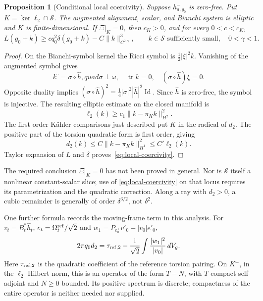 \documentclass[11pt]{article}
\newcommand{\tr}{\operatorname{tr}}
\newcommand{\Id}{\operatorname{Id}}
\newcommand{\dd}{\,dV_g}
\newtheorem{proposition}[theorem]{Proposition}
\theoremstyle{definition}
\theoremstyle{remark}
\begin{document}
\begin{proposition}[Conditional local coercivity]
\label{prop:conditional-local}
Suppose $h_{a,g_0}^-$ is zero-free. Put
$K=\ker\ell_2\cap\mathcal S$. The augmented alignment, scalar, and
Bianchi system is elliptic and $K$ is finite-dimensional. If
$\Xi|_K=0$, then $c_K>0$, and for every $0<c<c_K$,
\begin{equation}
 L(g_0+k)\ge c q_0^2\delta(g_0+k)
                   -C\|k\|_{C^{2,\gamma}}^3,
 \qquad k\in\mathcal S\text{ sufficiently small},\quad0<\gamma<1.
 \label{eq:local-coercivity}
\end{equation}
\end{proposition}
\begin{proof}
On the Bianchi-symbol kernel the Ricci symbol is
$\tfrac12|\xi|^2k$. Vanishing of the augmented symbol gives
\[
 k^\circ=\sigma\circ\widehat h,quad \sigma\perp\omega,\quad
 \tr k=0,\quad (\sigma\circ\widehat h)\xi=0.
\]
Opposite duality implies
$(\sigma\circ\widehat h)^2=\tfrac14|\sigma|^2|\widehat h|^2\Id$.
Since $\widehat h$ is zero-free, the symbol is injective. The resulting
elliptic estimate on the closed manifold is
\[
 \ell_2(k)\ge c_1\|k-\pi_Kk\|_{H^2}^2.
\]
The first-order K\"ahler comparisons just described put $K$ in the
radical of $d_2$. The positive part of the torsion quadratic form is
first order, giving
\[
 d_2(k)\le C\|k-\pi_Kk\|_{H^1}^2\le C'\ell_2(k).
\]
Taylor expansion of $L$ and $\delta$ proves~\eqref{eq:local-coercivity}.
\end{proof}
The required conclusion $\Xi|_K=0$ has not been proved in general.
Nor is $\mathcal S$ itself a nonlinear constant-scalar slice; use of
\eqref{eq:local-coercivity} on that locus requires its parametrization
and the quadratic correction. Along a ray with $d_2>0$, a cubic remainder
is generally of order $\delta^{3/2}$, not $\delta^2$.

One further formula records the moving-frame term in this analysis.
For $v_t=B_t^*\widehat h_t$, $e_t=\Omega_t^{\rm ref}/\sqrt2$ and
$w_1=P_{e_0^\perp}v'_0-|v_0|e'_0$,
\begin{equation}
 2\pi q_0d_2=\tau_{{\rm ref},2}
             -\frac1{\sqrt2}\int\frac{|w_1|^2}{|v_0|}\dd.
 \label{eq:delta-Hessian}
\end{equation}
Here $\tau_{{\rm ref},2}$ is the quadratic coefficient of the reference
torsion pairing. On $K^\perp$, in the $\ell_2$ Hilbert norm, this is an
operator of the form $T-N$, with $T$ compact self-adjoint and $N\ge0$
bounded. Its positive spectrum is discrete; compactness of the entire
operator is neither needed nor supplied.
\end{document}

